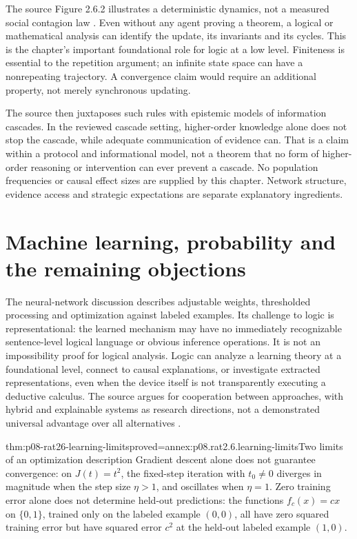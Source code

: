 The source Figure 2.6.2 illustrates a deterministic dynamics, not a
measured social contagion law \cite[pp.~191--192]{VanBenthemLiuSmets2021Logico}.
Even without any agent proving a theorem, a logical or mathematical
analysis can identify the update, its invariants and its cycles. This
is the chapter's important foundational role for logic at a low level.
Finiteness is essential to the repetition argument; an infinite state
space can have a nonrepeating trajectory. A convergence claim would
require an additional property, not merely synchronous updating.

The source then juxtaposes such rules with epistemic models of information
cascades. In the reviewed cascade setting, higher-order knowledge alone
does not stop the cascade, while adequate communication of evidence can.
That is a claim within a protocol and informational model, not a theorem
that no form of higher-order reasoning or intervention can ever prevent
a cascade. No population frequencies or causal effect sizes are supplied
by this chapter. Network structure, evidence access and strategic
expectations are separate explanatory ingredients.

\section{Machine learning, probability and the remaining objections}

The neural-network discussion describes adjustable weights, thresholded
processing and optimization against labeled examples. Its challenge to
logic is representational: the learned mechanism may have no immediately
recognizable sentence-level logical language or obvious inference
operations. It is not an impossibility proof for logical analysis.
Logic can analyze a learning theory at a foundational level, connect to
causal explanations, or investigate extracted representations, even when
the device itself is not transparently executing a deductive calculus.
The source argues for cooperation between approaches, with hybrid and
explainable systems as research directions, not a demonstrated universal
advantage over all alternatives
\cite[pp.~192--193]{VanBenthemLiuSmets2021Logico}.

\begin{hbtheorem}{thm:p08-rat26-learning-limits}{proved=annex:p08.rat2.6.learning-limits}{Two limits of an optimization description}
Gradient descent alone does not guarantee convergence: on \(J(t)=t^2\),
the fixed-step iteration with \(t_0\ne0\) diverges in magnitude when
the step size \(\eta>1\), and oscillates when \(\eta=1\).
Zero training error alone does not determine held-out predictions:
the functions \(f_c(x)=cx\) on \(\{0,1\}\), trained only on the
labeled example \((0,0)\), all have zero squared training error but
have squared error \(c^2\) at the held-out labeled example \((1,0)\).
\end{hbtheorem}

